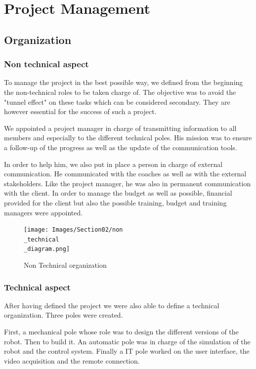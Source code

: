 \section{Project Management}\insertloftspace
\setcounter{figure}{0}\setcounter{table}{0}

\subsection{Organization}
\subsubsection{Non technical aspect}

To manage the project in the best possible way, we defined from the beginning the non-technical roles to be taken charge of. The objective was to avoid the "tunnel effect" on these tasks which can be considered secondary. They are however essential for the success of such a project. 

\bigbreak
We appointed a project manager in charge of transmitting information to all members and especially to the different technical poles. His mission was to ensure a follow-up of the progress as well as the update of the communication tools. 

\bigbreak
In order to help him, we also put in place a person in charge of external communication. He communicated with the coaches as well as with the external stakeholders. Like the project manager, he was also in permanent communication with the client. In order to manage the budget as well as possible, financial provided for the client but also the possible training, budget and training managers were appointed. 

\begin{figure}[ht]
    \centering
    \texttt{[image: Images/Section02/non\\\_technical\\\_diagram.png]}
    \caption{Non Technical organization}
    \label{fig:nonTechOrga}
\end{figure}

\subsubsection{Technical aspect}

After having defined the project we were also able to define a technical organization. Three poles were created. 

\bigbreak
First, a mechanical pole whose role was to design the different versions of the robot. Then to build it. An automatic pole was in charge of the simulation of the robot and the control system. Finally a IT pole worked on the user interface, the video acquisition and the remote connection.

